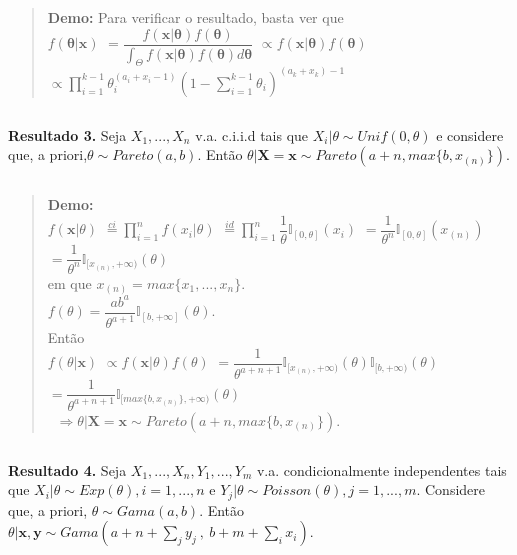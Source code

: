 \documentclass[
]{book}
\begin{document}
\(~\)

\begin{quote}
\textbf{Demo:} Para verificar o resultado, basta ver que\\
\(f(\boldsymbol\theta|\boldsymbol x)\) \(=\dfrac{f(\boldsymbol x| \boldsymbol \theta)f(\boldsymbol \theta)}{\int_\Theta f(\boldsymbol x| \boldsymbol \theta)f(\boldsymbol \theta)d\boldsymbol \theta}\) \(\propto f(\boldsymbol x| \boldsymbol \theta)f(\boldsymbol \theta)\) \(\propto \prod_{i=1}^{k-1}\theta_i^{(a_i+x_i-1)}\left(1-\sum_{i=1}^{k-1}\theta_i\right)^{(a_k+x_k)-1}\)
\end{quote}

\(~\)

\textbf{Resultado 3.} Seja \(X_1,...,X_n\) v.a. c.i.i.d tais que \(X_i|\theta \sim Unif(0,\theta)\) e considere que, a priori,\(\theta \sim Pareto(a,b)\). Então \(\theta|\boldsymbol X = \boldsymbol x \sim Pareto\left(a+n,max\{b,x_{(n)}\}\right)\).

\(~\)

\begin{quote}
\textbf{Demo:}\\
\(f(\boldsymbol x|\theta)\) \(\overset{ci}{=}\prod_{i=1}^nf(x_i|\theta)\) \(\overset{id}{=}\prod_{i=1}^n\dfrac{1}{\theta}\mathbb{I}_{[0,\theta]}(x_i)\) \(=\dfrac{1}{\theta^n}\mathbb{I}_{[0,\theta]}(x_{(n)})\) \(=\dfrac{1}{\theta^n}\mathbb{I}_{[x_{(n)},+\infty)}(\theta)\)\\
em que \(x_{(n)}=max\{x_1,...,x_n\}\).\\
\(~\)\\
\(f(\theta)=\dfrac{ab^a}{\theta^{a+1}}\mathbb{I}_{[b,+\infty]}(\theta)\).\\
Então\\
\(f(\theta| \boldsymbol x)\) \(\propto f(\boldsymbol x|\theta)f(\theta)\) \(=\dfrac{1}{\theta^{a+n+1}}\mathbb{I}_{[x_{(n)},+\infty)}(\theta)\mathbb{I}_{[b,+\infty)}(\theta)\) \(=\dfrac{1}{\theta^{a+n+1}}\mathbb{I}_{[max\{b,x_{(n)}\},+\infty)}(\theta)\)\\
\(~\)
\(\Rightarrow \theta|\boldsymbol X = \boldsymbol x \sim Pareto(a+n,max\{b,x_{(n)}\})\).
\end{quote}

\(~\)

\textbf{Resultado 4.} Seja \(X_1,...,X_n,Y_1,...,Y_m\) v.a. condicionalmente independentes tais que \(X_i|\theta\sim Exp(\theta),i=1,...,n\) e \(Y_j|\theta \sim Poisson(\theta),j=1,...,m\). Considere que, a priori, \(\theta \sim Gama(a,b)\). Então \(\theta| \boldsymbol x,\boldsymbol y \sim Gama(a+n+\sum_jy_j~,~b+m+\sum_ix_i)\).
\end{document}
